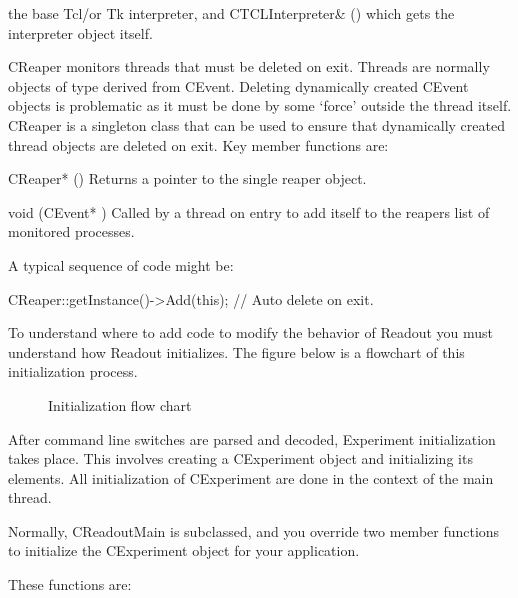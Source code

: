 \begin{description}
	       the base Tcl/or Tk interpreter, and CTCLInterpreter\&
	       () which gets the interpreter object
	       itself.
	       \htmlrule
	    \item{CReaper} monitors threads that must be deleted on exit.
	       Threads are normally objects of type derived from CEvent.
	       Deleting dynamically created CEvent objects is problematic as
	       it must be done by some `force' outside the thread itself.
	       CReaper is a singleton class that can be used to ensure that
	       dynamically created thread objects are deleted on exit.  Key 
	       member functions are:
	       \begin{description}
		  \item{CReaper* ()}
		     Returns a pointer to the single reaper object.
		  \item{void (CEvent* )}
		     Called by a thread on entry to add itself to the reapers
		     list of monitored processes.
	       \end{description}
	       A typical sequence of code might be:
	       \begin{example}
		  CReaper::getInstance()->Add(this);   // Auto delete on exit.
	       \end{example}
      \end{description}
      To understand where to add code to modify the behavior
      of Readout you must understand how Readout initializes.
      The figure below is a flowchart of this initialization process.
      \begin{figure}[htb]
	 \caption{Initialization flow chart}
      \end{figure}
      
      After command line switches are parsed and decoded, Experiment 
      initialization takes place.  This involves creating a CExperiment
      object and initializing its elements.  All initialization of CExperiment
      are done in the context of the main thread.
      
      Normally, CReadoutMain is subclassed, and you override two member
      functions to initialize the CExperiment object for your application.
      
      These functions are:
      
